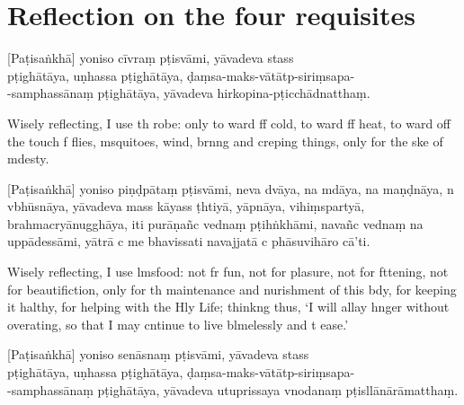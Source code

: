 \restoreArrayStretch

\clearpage

\chapter[Four requisites]{Reflection on the four requisites}%


\begin{leader}
\end{leader}


[Paṭisaṅkhā] yoniso cīvraṃ pṭisvāmi, yāvadeva stass\\
pṭighātāya, uṇhassa pṭighātāya, ḍaṃsa-maks-vātātp-siriṃsapa-\\
-samphassānaṃ pṭighātāya, yāvadeva hirkopina-pṭicchādnatthaṃ.

\begin{english}
  Wisely reflecting, I use th robe: only to ward ff cold, to ward ff heat, to ward off the touch f flies, msquitoes, wind, brnng and creping things, only for the ske of mdesty.
\end{english}

[Paṭisaṅkhā] yoniso piṇḍpātaṃ pṭisvāmi, neva dvāya, na mdāya, na maṇḍnāya, n vbhūsnāya, yāvadeva mass kāyass ṭhtiyā, yāpnāya, vihiṃspartyā, brahmacryānugghāya, iti purāṇañc vednaṃ pṭihṅkhāmi, navañc vednaṃ na uppādessāmi, yātrā c me bhavissati navajjatā c phāsuvihāro cā'ti.

\begin{english}
  Wisely reflecting, I use lmsfood: not fr fun, not for plasure, not for fttening, not for beautifiction, only for th maintenance and nurishment of this bdy, for keeping it halthy, for helping with the Hly Life; thinkng thus, `I will allay hnger without overating, so that I may cntinue to live blmelessly and t ease.'
\end{english}

[Paṭisaṅkhā] yoniso senāsnaṃ pṭisvāmi, yāvadeva stass\\
pṭighātāya, uṇhassa pṭighātāya, ḍaṃsa-maks-vātātp-siriṃsapa-\\
-samphassānaṃ pṭighātāya, yāvadeva utuprissaya vnodanaṃ pṭisllānārāmatthaṃ.

